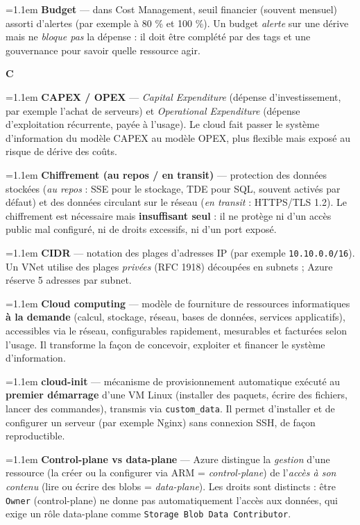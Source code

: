 \documentclass[11pt,a4paper]{article}
\newcommand{\co}[1]{\texttt{\small #1}}
\newcommand{\lettre}[1]{%
  \par\addvspace{9pt}\needspace{4.5\baselineskip}%
  \markright{#1}%
  {\noindent\sffamily\bfseries\Large\color{azure}#1}%
  \nobreak\vspace{0.4mm}{\color{azure!45}\hrule height 1pt}\nobreak\vspace{3mm}\par}
\newcommand{\df}[2]{%
  \par\addvspace{4pt}\needspace{2\baselineskip}%
  \hangindent=1.1em\hangafter=1
  {\sffamily\bfseries\color{azuredark}#1} — #2\par}
\begin{document}
\df{Budget}{dans Cost Management, seuil financier (souvent mensuel) assorti d'alertes (par exemple à 80 \% et 100 \%). Un budget \emph{alerte} sur une dérive mais ne \emph{bloque pas} la dépense : il doit être complété par des tags et une gouvernance pour savoir quelle ressource agir.}

\lettre{C}

\df{CAPEX / OPEX}{\emph{Capital Expenditure} (dépense d'investissement, par exemple l'achat de serveurs) et \emph{Operational Expenditure} (dépense d'exploitation récurrente, payée à l'usage). Le cloud fait passer le système d'information du modèle CAPEX au modèle OPEX, plus flexible mais exposé au risque de dérive des coûts.}

\df{Chiffrement (au repos / en transit)}{protection des données stockées (\emph{au repos} : SSE pour le stockage, TDE pour SQL, souvent activés par défaut) et des données circulant sur le réseau (\emph{en transit} : HTTPS/TLS 1.2). Le chiffrement est nécessaire mais \textbf{insuffisant seul} : il ne protège ni d'un accès public mal configuré, ni de droits excessifs, ni d'un port exposé.}

\df{CIDR}{notation des plages d'adresses IP (par exemple \co{10.10.0.0/16}). Un VNet utilise des plages \emph{privées} (RFC 1918) découpées en subnets ; Azure réserve 5 adresses par subnet.}

\df{Cloud computing}{modèle de fourniture de ressources informatiques \textbf{à la demande} (calcul, stockage, réseau, bases de données, services applicatifs), accessibles via le réseau, configurables rapidement, mesurables et facturées selon l'usage. Il transforme la façon de concevoir, exploiter et financer le système d'information.}

\df{cloud-init}{mécanisme de provisionnement automatique exécuté au \textbf{premier démarrage} d'une VM Linux (installer des paquets, écrire des fichiers, lancer des commandes), transmis via \co{custom\_data}. Il permet d'installer et de configurer un serveur (par exemple Nginx) sans connexion SSH, de façon reproductible.}

\df{Control-plane vs data-plane}{Azure distingue la \emph{gestion} d'une ressource (la créer ou la configurer via ARM = \emph{control-plane}) de l'\emph{accès à son contenu} (lire ou écrire des blobs = \emph{data-plane}). Les droits sont distincts : être \co{Owner} (control-plane) ne donne pas automatiquement l'accès aux données, qui exige un rôle data-plane comme \co{Storage Blob Data Contributor}.}
\end{document}
